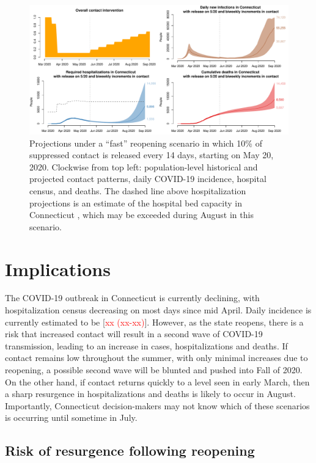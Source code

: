 \documentclass[11pt]{article}
\newcommand{\comment}[1]{[\textcolor{red}{#1}]}
\begin{document}
\begin{figure}
\centering
\includegraphics[width=\textwidth]{figures/fast.pdf}
\caption{Projections under a ``fast'' reopening scenario in which 10\% of suppressed contact is released every 14 days, starting on May 20, 2020.  Clockwise from top left: population-level historical and projected contact patterns, daily COVID-19 incidence, hospital census, and deaths. The dashed line above hospitalization projections is an estimate of the hospital bed capacity in Connecticut \citep{CHAwebsite}, which may be exceeded during August in this scenario. }
\label{fig:fast}
\end{figure}




\section*{Implications}

The COVID-19 outbreak in Connecticut is currently declining, with hospitalization census decreasing on most days since mid April.  Daily incidence is currently estimated to be \comment{xx (xx-xx)}.  However, as the state reopens, there is a risk that increased contact will result in a second wave of COVID-19 transmission, leading to an increase in cases, hospitalizations and deaths.  If contact remains low throughout the summer, with only minimal increases due to reopening, a possible second wave will be blunted and pushed into Fall of 2020.  On the other hand, if contact returns quickly to a level seen in early March, then a sharp resurgence in hospitalizations and deaths is likely to occur in August.  Importantly, Connecticut decision-makers may not know which of these scenarios is occurring until sometime in July.  


\subsection*{Risk of resurgence following reopening} 
\end{document}
